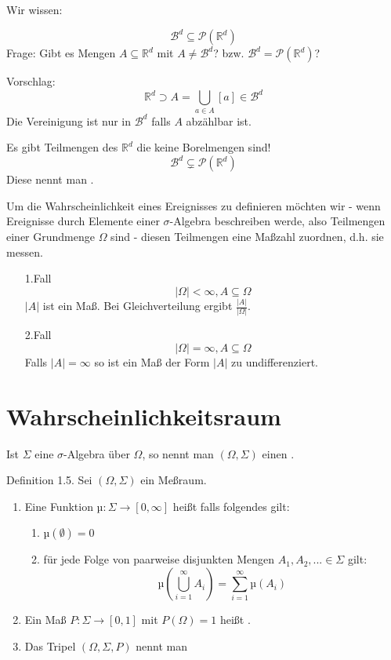 Wir wissen:

$$ \mathcal B ^d \subseteq \mathcal P (\mathbb R^d) $$
Frage:
Gibt es Mengen $A \subseteq \mathbb R^d$ mit $A \neq \mathcal B^d$? bzw. $ \mathcal B ^d = \mathcal P (\mathbb R^d) $?

Vorschlag:
$$ \mathbb R^d \supset A = \bigcup_{a\in A} [a] \in \mathcal B^d $$
Die Vereinigung ist nur in $\mathcal B^d$ falls $A$ abzählbar ist.

Es gibt Teilmengen des $\mathbb R^d$ die keine Borelmengen sind!
$$ \mathcal B ^d \subsetneq \mathcal P (\mathbb R^d) $$
Diese nennt man .



Um die Wahrscheinlichkeit eines Ereignisses zu definieren möchten wir - wenn Ereignisse durch Elemente einer $\sigma$-Algebra beschreiben werde, also Teilmengen einer Grundmenge $\Omega$ sind - diesen Teilmengen eine Maßzahl zuordnen, d.h. sie messen.
\begin{itemize}
 \item[1.Fall]
$$ \lvert \Omega \rvert < \infty, A \subseteq \Omega$$
$\lvert A \rvert$ ist ein Maß. Bei Gleichverteilung ergibt $\frac{\lvert A \rvert}{\lvert \Omega \rvert}$.
 \item[2.Fall]
$$ \lvert \Omega \rvert = \infty, A \subseteq \Omega$$
Falls $\lvert A \rvert = \infty$ so ist ein Maß der Form $\lvert A \rvert$ zu undifferenziert.
\end{itemize}
\section{Wahrscheinlichkeitsraum}
Ist $\Sigma$ eine $\sigma$-Algebra über $\Omega$, so nennt man $(\Omega,\Sigma)$ einen .

Definition 1.5. Sei $(\Omega,\Sigma)$ ein Meßraum.
\begin{enumerate}
 \item Eine Funktion $µ: \Sigma \rightarrow [0,\infty]$ heißt  falls folgendes gilt:
  \begin{enumerate}
   \item $µ(\emptyset) = 0$

   \item für jede Folge von paarweise disjunkten Mengen $A_1, A_2, ... \in \Sigma$ gilt:
$$ µ \left ( \bigcup_{i=1}^\infty A_i \right ) = \sum_{i=1}^\infty µ \left ( A_i \right ) $$
  \end{enumerate}
 \item Ein Maß $P: \Sigma \rightarrow [0,1]$ mit $P(\Omega) = 1$ heißt .
 \item Das Tripel $(\Omega,\Sigma,P)$ nennt man 
\end{enumerate}

